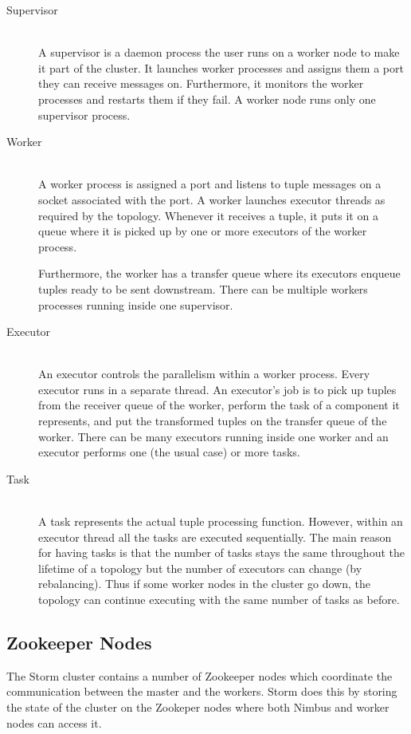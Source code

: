 \documentclass[bsc,logo,frontabs,twoside,singlespacing,normalheadings,parskip]{infthesis}\usepackage[]{graphicx}\usepackage[]{color}
\begin{document}
\begin{description}
	\item[Supervisor] \hfill \\
	A supervisor is a daemon process the user runs on a worker node to make it part of the cluster. It launches worker processes and assigns them a port they can receive messages on. Furthermore, it monitors the worker processes and restarts them if they fail. A worker node runs only one supervisor process.
	\item[Worker] \hfill \\
	A worker process is assigned a port and listens to tuple messages on a socket associated with the port. A worker launches executor threads as required by the topology. Whenever it receives a tuple, it puts it on a queue where it is picked up by one or more executors of the worker process.
	
	Furthermore, the worker has a transfer queue where its executors enqueue tuples ready to be sent downstream. There can be multiple workers processes running inside one supervisor.
	\item[Executor] \hfill \\
	An executor controls the parallelism within a worker process. Every executor runs in a separate thread. An executor's job is to pick up tuples from the receiver queue of the worker, perform the task of a component it represents, and put the transformed tuples on the transfer queue of the worker. There can be many executors running inside one worker and an executor performs one (the usual case) or more tasks.
	\item[Task] \hfill \\
	A task represents the actual tuple processing function. However, within an executor thread all the tasks are executed sequentially. The main reason for having tasks is that the number of tasks stays the same throughout the lifetime of a topology but the number of executors can change (by rebalancing). Thus if some worker nodes in the cluster go down, the topology can continue executing with the same number of tasks as before.
\end{description}

\subsection{Zookeeper Nodes}
\label{subsec:zookeeper}

The Storm cluster contains a number of Zookeeper nodes which coordinate the communication between the master and the workers. Storm does this by storing the state of the cluster on the Zookeper nodes where both Nimbus and worker nodes can access it.
\end{document}
